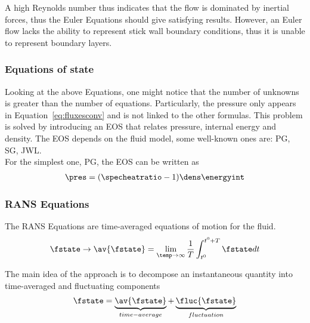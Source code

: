\documentclass[../main.tex]{subfiles}
\begin{document}
A high Reynolds number thus indicates that the flow is dominated by inertial forces, thus the Euler Equations should give satisfying results. However, an Euler flow lacks the ability to represent stick wall boundary conditions, thus it is unable to represent boundary layers.

\subsubsection{Equations of state}
Looking at the above Equations, one might notice that the number of unknowns is greater than the number of equations. Particularly, the pressure only appears in Equation~\eqref{eq:fluxesconv} and is not linked to the other formulas. This problem is solved by introducing an \acf{EOS} that relates pressure, internal energy and density. The \ac{EOS} depends on the fluid model, some well-known ones are: \ac{PG}, \ac{SG}, \ac{JWL}.\\
For the simplest one, PG, the \ac{EOS} can be written as
\begin{align}\label{eq:eos_pg}
\pres=(\specheatratio-1)\dens\energyint
\end{align}


\subsubsection{\acf{RANS} Equations}\label{sec:rans}
The \acf{RANS} Equations are time-averaged equations of motion for the fluid.
\begin{align}\label{eq:rans_averaging}
\fstate \rightarrow \av{\fstate} = \lim_{\temp \to \infty} \frac{1}{T} \int_{t^0}^{t^0+T} \fstate dt
\end{align}

The main idea of the approach is to decompose an instantaneous quantity into time-averaged and fluctuating components
\begin{align}\label{eq:rans_decomposition}
\fstate=\underbrace{\av{\fstate}}_{time-average}+\underbrace{\fluc{\fstate}}_{fluctuation}
\end{align}
\end{document}

